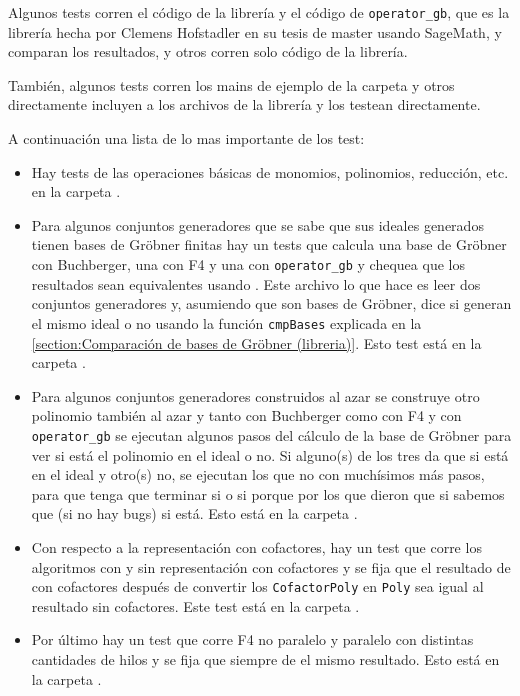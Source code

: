 \documentclass[12pt]{report}
\theoremstyle{customstyle}
\theoremstyle{factstyle}
\begin{document}
Algunos tests corren el código de la librería y el código de \texttt{operator\_gb}, que es la librería hecha por Clemens Hofstadler en su tesis de master \cite{thesis:Hof20} usando SageMath, y comparan los resultados, y otros corren solo código de la librería.

También, algunos tests corren los mains de ejemplo de la carpeta  y otros directamente incluyen a los archivos de la librería y los testean directamente.

A continuación una lista de lo mas importante de los test:

\begin{itemize}
  \item Hay tests de las operaciones básicas de monomios, polinomios, reducción, etc. en la carpeta .
  \item Para algunos conjuntos generadores que se sabe que sus ideales generados tienen bases de Gröbner finitas hay un tests que calcula una base de Gröbner con Buchberger, una con F4 y una con \texttt{operator\_gb} y chequea que los resultados sean equivalentes usando . Este archivo lo que hace es leer dos conjuntos generadores y, asumiendo que son bases de Gröbner, dice si generan el mismo ideal o no usando la función \texttt{cmpBases} explicada en la \cref{section:Comparación de bases de Gröbner (libreria)}. Esto test está en la carpeta .
  \item Para algunos conjuntos generadores construidos al azar se construye otro polinomio también al azar y tanto con Buchberger como con F4 y con \texttt{operator\_gb} se ejecutan algunos pasos del cálculo de la base de Gröbner para ver si está el polinomio en el ideal o no. Si alguno(s) de los tres da que si está en el ideal y otro(s) no, se ejecutan los que no con muchísimos más pasos, para que tenga que terminar si o si porque por los que dieron que si sabemos que (si no hay bugs) si está. Esto está en la carpeta . %
  \item Con respecto a la representación con cofactores, hay un test que corre los algoritmos con y sin representación con cofactores y se fija que el resultado de con cofactores después de convertir los \texttt{CofactorPoly} en \texttt{Poly} sea igual al resultado sin cofactores. Este test está en la carpeta .
  \item Por último hay un test que corre F4 no paralelo y paralelo con distintas cantidades de hilos y se fija que siempre de el mismo resultado. Esto está en la carpeta .
\end{itemize}
\end{document}
